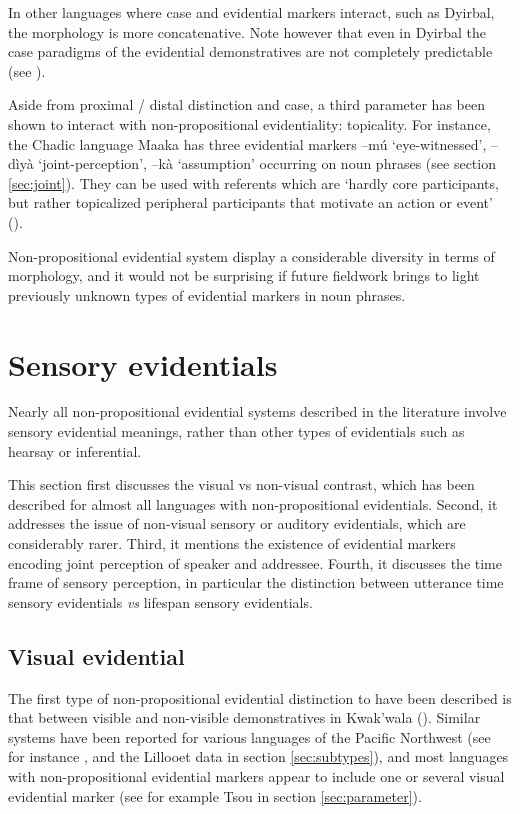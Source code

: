 \documentclass[oneside,a4paper,11pt]{article}
\newcommand{\ipa}[1]{{\phon \mbox{#1}}} %
\begin{document}
In other languages where case and evidential markers interact, such as Dyirbal, the morphology is more concatenative. Note however that even in Dyirbal the case paradigms of the evidential demonstratives are not completely predictable (see \citealt{dixon14nonvisible}).

Aside from proximal / distal distinction and case, a third parameter has been shown to interact with non-propositional evidentiality: topicality. For instance,  the Chadic language Maaka has three evidential markers \ipa{--mú} `eye-witnessed', \ipa{--dìyà} `joint-perception', \ipa{--kà} `assumption' occurring on noun phrases (see section \ref{sec:joint}). They can be used with referents which are `hardly core participants, but rather topicalized peripheral participants that motivate an action or event' (\citealt[195-7]{storch14maaka}).

 

Non-propositional evidential system display a considerable diversity in terms of morphology, and it would not be surprising if future fieldwork brings to light previously unknown types of evidential markers in noun phrases.

\section{Sensory evidentials} \label{sec:sensory}
Nearly all non-propositional evidential systems described in the literature involve sensory evidential meanings, rather than other types of evidentials such as hearsay or inferential. 

This section first discusses the visual vs non-visual contrast, which has been described for almost all languages with non-propositional evidentials. Second, it addresses the issue of non-visual sensory or auditory evidentials, which are considerably rarer.  Third, it mentions the existence of evidential markers encoding joint perception of speaker and addressee. Fourth, it discusses the time frame of sensory perception, in particular the distinction between utterance time sensory evidentials \textit{vs} lifespan sensory evidentials.

\subsection{Visual evidential} \label{sec:visible}
The first type of non-propositional evidential distinction to have been described  is that between visible and non-visible demonstratives in Kwak'wala (\citealt[527-531]{boas11kwakiutl}). Similar systems have been reported for various languages of the Pacific Northwest (see for instance \citealt{bach06deixis.wakashan}, and the Lillooet data in section \ref{sec:subtypes}), and most languages with non-propositional evidential markers appear to include one or several visual evidential marker (see for example Tsou in section \ref{sec:parameter}).  
\end{document}
